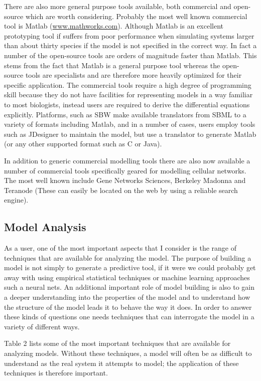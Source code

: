 \documentclass[12pt]{article}
\begin{document}
{%

\medskip
There are also more general purpose tools available, both commercial and open-source which are worth considering. Probably the most well known commercial tool is Matlab (\url{www.mathworks.com}). Although Matlab is an excellent prototyping tool if suffers from poor performance when simulating systems larger than about thirty species if the model is not specified in the correct way. In fact a number of the open-source tools are orders of magnitude faster than Matlab. This stems from the fact that Matlab is a general purpose tool whereas the open-source tools are specialists and are therefore more heavily optimized for their specific application. The commercial tools require a high degree of programming skill because they do not have facilities for representing models in a way familiar to most biologists, instead users are required to derive the differential equations explicitly. Platforms, such as SBW make available translators from SBML to a variety of formats including Matlab, and in a number of cases, users employ tools such as JDesigner to maintain the model, but use a translator to generate Matlab (or any other supported format such as C or Java).

In addition to generic commercial modelling tools there are also now available a number
of commercial tools specifically geared for modelling cellular networks. The most well known
include Gene Networks Sciences, Berkeley Madonna and Teranode (These can easily be located on the web by using a reliable search engine).

\subsection{Model Analysis}

As a user, one of the most important aspects that I consider is the range of techniques that
are available for analyzing the model. The purpose of building a model is not simply to generate
a predictive tool, if it were we could probably get away with using empirical statistical techniques or machine learning approaches such a neural nets. An additional important role of model building is also to gain a deeper understanding into the properties of the model and to understand how the structure of the model leads it to behave the way it does. In order to answer these kinds of questions one needs techniques that can interrogate the model in a variety of different ways.

Table 2 lists some of the most important techniques that are available for analyzing models. Without these techniques, a model will often be as difficult to understand as the real system it attempts to model; the application of these techniques is therefore important.

}
\end{document}
